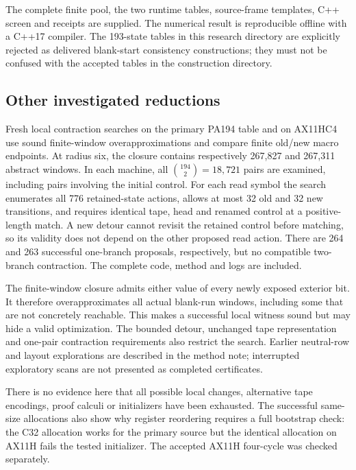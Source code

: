 \documentclass[11pt,letterpaper]{article}
\begin{document}
The complete finite pool, the two runtime tables, source-frame templates, C++ screen and receipts are supplied. The numerical result is reproducible offline with a C++17 compiler. The 193-state tables in this research directory are explicitly rejected as delivered blank-start consistency constructions; they must not be confused with the accepted tables in the construction directory.

\subsection{Other investigated reductions}

Fresh local contraction searches on the primary PA194 table and on AX11HC4 use sound finite-window overapproximations and compare finite old/new macro endpoints. At radius six, the closure contains respectively 267,827 and 267,311 abstract windows. In each machine, all $\binom{194}{2}=18,721$ pairs are examined, including pairs involving the initial control. For each read symbol the search enumerates all 776 retained-state actions, allows at most 32 old and 32 new transitions, and requires identical tape, head and renamed control at a positive-length match. A new detour cannot revisit the retained control before matching, so its validity does not depend on the other proposed read action. There are 264 and 263 successful one-branch proposals, respectively, but no compatible two-branch contraction. The complete code, method and logs are included.

The finite-window closure admits either value of every newly exposed exterior bit. It therefore overapproximates all actual blank-run windows, including some that are not concretely reachable. This makes a successful local witness sound but may hide a valid optimization. The bounded detour, unchanged tape representation and one-pair contraction requirements also restrict the search. Earlier neutral-row and layout explorations are described in the method note; interrupted exploratory scans are not presented as completed certificates.

There is no evidence here that all possible local changes, alternative tape encodings, proof calculi or initializers have been exhausted. The successful same-size allocations also show why register reordering requires a full bootstrap check: the C32 allocation works for the primary source but the identical allocation on AX11H fails the tested initializer. The accepted AX11H four-cycle was checked separately.
\end{document}
